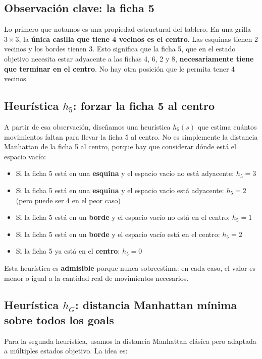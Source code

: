 \documentclass[12pt, a4paper]{article}
\begin{document}
\subsection{Observación clave: la ficha 5}

Lo primero que notamos es una propiedad estructural del tablero. En una grilla $3 \times 3$, la \textbf{única casilla que tiene 4 vecinos es el centro}. Las esquinas tienen 2 vecinos y los bordes tienen 3. Esto significa que la ficha 5, que en el estado objetivo necesita estar adyacente a las fichas 4, 6, 2 y 8, \textbf{necesariamente tiene que terminar en el centro}. No hay otra posición que le permita tener 4 vecinos.

\subsection{Heurística $h_5$: forzar la ficha 5 al centro}

A partir de esa observación, diseñamos una heurística $h_5(s)$ que estima cuántos movimientos faltan para llevar la ficha 5 al centro. No es simplemente la distancia Manhattan de la ficha 5 al centro, porque hay que considerar dónde está el espacio vacío:

\begin{itemize}
  \item Si la ficha 5 está en una \textbf{esquina} y el espacio vacío no está adyacente: $h_5 = 3$
  \item Si la ficha 5 está en una \textbf{esquina} y el espacio vacío está adyacente: $h_5 = 2$ (pero puede ser 4 en el peor caso)
  \item Si la ficha 5 está en un \textbf{borde} y el espacio vacío no está en el centro: $h_5 = 1$
  \item Si la ficha 5 está en un \textbf{borde} y el espacio vacío está en el centro: $h_5 = 2$
  \item Si la ficha 5 ya está en el \textbf{centro}: $h_5 = 0$
\end{itemize}

Esta heurística es \textbf{admisible} porque nunca sobreestima: en cada caso, el valor es menor o igual a la cantidad real de movimientos necesarios.

\subsection{Heurística $h_G$: distancia Manhattan mínima sobre todos los goals}

Para la segunda heurística, usamos la distancia Manhattan clásica pero adaptada a múltiples estados objetivo. La idea es:
\end{document}
